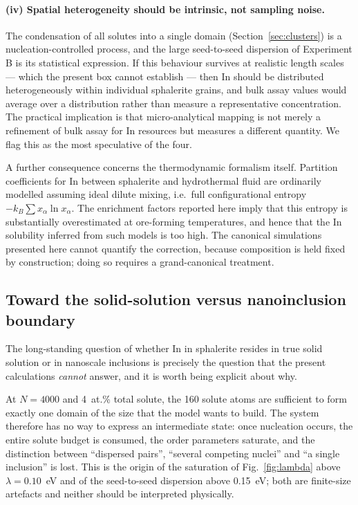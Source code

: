 \documentclass[11pt,a4paper]{article}
\begin{document}
\paragraph{(iv) Spatial heterogeneity should be intrinsic, not sampling noise.}
The condensation of all solutes into a single domain
(Section~\ref{sec:clusters}) is a nucleation-controlled process, and the large
seed-to-seed dispersion of Experiment B is its statistical expression. If this
behaviour survives at realistic length scales --- which the present box cannot
establish --- then In should be distributed heterogeneously within individual
sphalerite grains, and bulk assay values would average over a distribution
rather than measure a representative concentration. The practical implication is
that micro-analytical mapping is not merely a refinement of bulk assay for In
resources but measures a different quantity. We flag this as the most
speculative of the four.

A further consequence concerns the thermodynamic formalism itself. Partition
coefficients for In between sphalerite and hydrothermal fluid are ordinarily
modelled assuming ideal dilute mixing, i.e.\ full configurational entropy
$-k_B \sum x_\alpha \ln x_\alpha$. The enrichment factors reported here imply
that this entropy is substantially overestimated at ore-forming temperatures,
and hence that the In solubility inferred from such models is too high. The
canonical simulations presented here cannot quantify the correction, because
composition is held fixed by construction; doing so requires a grand-canonical
treatment.

\subsection{Toward the solid-solution versus nanoinclusion boundary}
\label{sec:boundary}

The long-standing question of whether In in sphalerite resides in true solid
solution or in nanoscale inclusions is precisely the question that the present
calculations \emph{cannot} answer, and it is worth being explicit about why.

At $N = 4000$ and 4~at.\% total solute, the 160 solute atoms are sufficient to
form exactly one domain of the size that the model wants to build. The system
therefore has no way to express an intermediate state: once nucleation occurs,
the entire solute budget is consumed, the order parameters saturate, and the
distinction between ``dispersed pairs'', ``several competing nuclei'' and ``a
single inclusion'' is lost. This is the origin of the saturation of
Fig.~\ref{fig:lambda} above $\lambda = 0.10$~eV and of the seed-to-seed
dispersion above 0.15~eV; both are finite-size artefacts and neither should be
interpreted physically.
\end{document}
